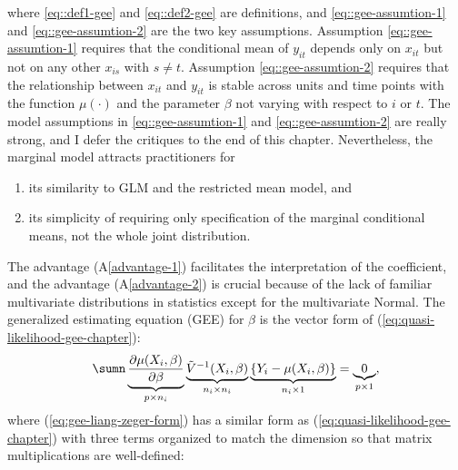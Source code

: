 where \eqref{eq::def1-gee} and \eqref{eq::def2-gee} are definitions, and \eqref{eq::gee-assumtion-1} and \eqref{eq::gee-assumtion-2}
are the two key assumptions. Assumption \eqref{eq::gee-assumtion-1} requires that the conditional mean of $y_{it}$ depends only on $x_{it}$
but not on any other $x_{is}$ with $s\neq t$. Assumption \eqref{eq::gee-assumtion-2} requires
that the relationship between $x_{it}$ and $y_{it}$ is stable across units and time points with the function $\mu(\cdot)$ and the parameter
$\beta$ not varying with respect to $i$ or $t$. The model assumptions in \eqref{eq::gee-assumtion-1} and \eqref{eq::gee-assumtion-2} 
are really strong, and I defer the critiques to the end of this chapter.
Nevertheless, the marginal model attracts practitioners for 
\begin{enumerate}
[({A}1)]
\item\label{advantage-1}
its similarity to GLM and the restricted mean model, and
\item \label{advantage-2}
its simplicity of requiring only specification of the marginal conditional
means, not the whole joint distribution. 
\end{enumerate}
The advantage (A\ref{advantage-1}) facilitates
the interpretation of the coefficient, and the advantage (A\ref{advantage-2}) is crucial
because of the lack of familiar multivariate distributions in statistics
except for the multivariate Normal. The generalized estimating equation
(GEE) for $\beta$ is the vector form of (\ref{eq:quasi-likelihood-gee-chapter}):
\begin{equation}
\sumn\underbrace{\frac{\partial\mu (X_{i},\beta)}{\partial\beta}}_{p\times n_{i}}
\underbrace{\tilde{V}^{-1}(X_{i},\beta)}_{n_{i}\times n_{i}}
\underbrace{\left\{ Y_{i}-\mu(X_{i},\beta)\right\} }_{n_{i}\times1}
= \underbrace{0}_{p\times 1},\label{eq:gee-liang-zeger-form}
\end{equation}
where (\ref{eq:gee-liang-zeger-form}) has a similar form as (\ref{eq:quasi-likelihood-gee-chapter})
with three terms organized to match the dimension so that matrix multiplications
are well-defined:
